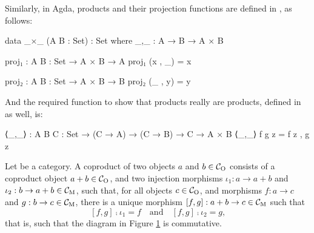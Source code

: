 \begin{example}
  \label{ex:product-agda}

  Similarly, in Agda, products and their projection functions are
  defined in , as follows:
  \begin{codeagda}
data _×_ (A B : Set) : Set where
  _,_ : A → B → A × B

proj₁ : {A B : Set} → A × B → A
proj₁ (x , _) = x

proj₂ : {A B : Set} → A × B → B
proj₂ (_ , y) = y
  \end{codeagda}
  And the required function to show that products really are products,
  defined in  as well, is:
  \begin{codeagda}
⟨_,_⟩ : {A B C : Set} → (C → A) → (C → B) → C → A × B
⟨_,_⟩ f g z = f z , g z
  \end{codeagda}

\end{example}

\begin{definition}
  \label{def:coproduct}


  Let  be a category. A coproduct of two objects $a$ and $b \in
  \mathcal{C}_{\operatorname{O}}$ consists of a coproduct object $a + b \in \mathcal{C}_{\operatorname{O}}$, and
  two injection morphisms $\iota_{1}: a \to a + b$ and $\iota_{2}: b
  \to a + b \in \mathcal{C}_{\operatorname{M}}$, such that, for all objects $c \in
  \mathcal{C}_{\operatorname{O}}$, and morphisms $f: a \to c$ and $g: b \to c \in \mathcal{C}_{\operatorname{M}}$,
  there is a unique morphism $[f,g]: a + b \to c \in \mathcal{C}_{\operatorname{M}}$ such
  that
  \begin{equation}
    \label{eq:coproduct}
    [f,g] \comp \iota_{1} = f
    \quad
    \text{and}
    \quad
    [f,g] \comp \iota_{2} = g
    \text{,}
  \end{equation}
  that is, such that the diagram in Figure \ref{fig:coproduct} is
  commutative.
  \begin{figure}[htbp]
    \begin{center}
    \end{center}
    \caption{}
    \label{fig:coproduct}
  \end{figure}

\end{definition}


